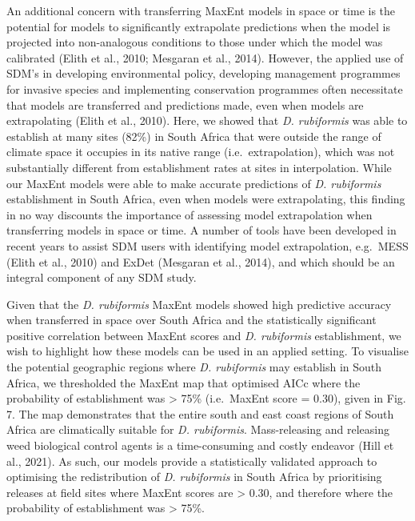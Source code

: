 \documentclass[12pt,]{article}
\begin{document}
An additional concern with transferring MaxEnt models in space or time
is the potential for models to significantly extrapolate predictions
when the model is projected into non-analogous conditions to those under
which the model was calibrated (Elith et al., 2010; Mesgaran et al.,
2014). However, the applied use of SDM's in developing environmental
policy, developing management programmes for invasive species and
implementing conservation programmes often necessitate that models are
transferred and predictions made, even when models are extrapolating
(Elith et al., 2010). Here, we showed that \emph{D. rubiformis} was able
to establish at many sites (82\%) in South Africa that were outside the
range of climate space it occupies in its native range
(i.e.~extrapolation), which was not substantially different from
establishment rates at sites in interpolation. While our MaxEnt models
were able to make accurate predictions of \emph{D. rubiformis}
establishment in South Africa, even when models were extrapolating, this
finding in no way discounts the importance of assessing model
extrapolation when transferring models in space or time. A number of
tools have been developed in recent years to assist SDM users with
identifying model extrapolation, e.g.~MESS (Elith et al., 2010) and
ExDet (Mesgaran et al., 2014), and which should be an integral component
of any SDM study.

Given that the \emph{D. rubiformis} MaxEnt models showed high predictive
accuracy when transferred in space over South Africa and the
statistically significant positive correlation between MaxEnt scores and
\emph{D. rubiformis} establishment, we wish to highlight how these
models can be used in an applied setting. To visualise the potential
geographic regions where \emph{D. rubiformis} may establish in South
Africa, we thresholded the MaxEnt map that optimised AICc where the
probability of establishment was \textgreater{} 75\% (i.e.~MaxEnt score
= 0.30), given in Fig. 7. The map demonstrates that the entire south and
east coast regions of South Africa are climatically suitable for
\emph{D. rubiformis}. Mass-releasing and releasing weed biological
control agents is a time-consuming and costly endeavor (Hill et al.,
2021). As such, our models provide a statistically validated approach to
optimising the redistribution of \emph{D. rubiformis} in South Africa by
prioritising releases at field sites where MaxEnt scores are
\textgreater{} 0.30, and therefore where the probability of
establishment was \textgreater{} 75\%.
\end{document}
